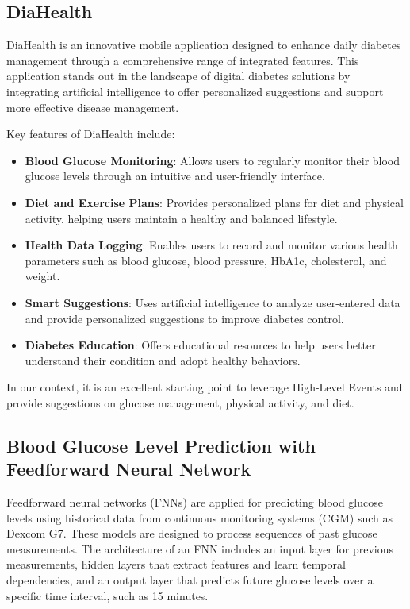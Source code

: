 \documentclass{article}
\begin{document}
\subsection{DiaHealth}

DiaHealth is an innovative mobile application designed to enhance daily diabetes management through a comprehensive range of integrated features. This application stands out in the landscape of digital diabetes solutions by integrating artificial intelligence to offer personalized suggestions and support more effective disease management.

Key features of DiaHealth include:

\begin{itemize}
    \item \textbf{Blood Glucose Monitoring}: Allows users to regularly monitor their blood glucose levels through an intuitive and user-friendly interface.
    
    \item \textbf{Diet and Exercise Plans}: Provides personalized plans for diet and physical activity, helping users maintain a healthy and balanced lifestyle.
    
    \item \textbf{Health Data Logging}: Enables users to record and monitor various health parameters such as blood glucose, blood pressure, HbA1c, cholesterol, and weight.
    
    \item \textbf{Smart Suggestions}: Uses artificial intelligence to analyze user-entered data and provide personalized suggestions to improve diabetes control.
    
    \item \textbf{Diabetes Education}: Offers educational resources to help users better understand their condition and adopt healthy behaviors.
\end{itemize}

In our context, it is an excellent starting point to leverage High-Level Events and provide suggestions on glucose management, physical activity, and diet.

\subsection{Blood Glucose Level Prediction with Feedforward Neural Network}

Feedforward neural networks (FNNs) are applied for predicting blood glucose levels using historical data from continuous monitoring systems (CGM) such as Dexcom G7. These models are designed to process sequences of past glucose measurements. The architecture of an FNN includes an input layer for previous measurements, hidden layers that extract features and learn temporal dependencies, and an output layer that predicts future glucose levels over a specific time interval, such as 15 minutes.
\end{document}
